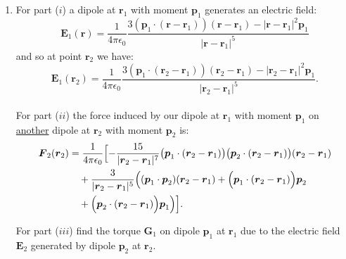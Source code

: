 \begin{enumerate}
    \newpage

    \item For part ($i$)
    a dipole at $\boldsymbol{r}_1$
    with moment $\boldsymbol{p}_1$
    generates an electric field:
    $$\boldsymbol{E}_1(\boldsymbol{r})=\frac{1}{4\pi\epsilon_0}
    \frac{3(\boldsymbol{p}_1\cdot(\boldsymbol{r}
    -\boldsymbol{r}_1))(\boldsymbol{r}-\boldsymbol{r}_1)
    -|\boldsymbol{r}-\boldsymbol{r}_1|^2\boldsymbol{p}_1}
    {|\boldsymbol{r}-\boldsymbol{r}_1|^5}$$
    and so at point $\boldsymbol{r}_2$ we have:
    $$\boldsymbol{E}_1(\boldsymbol{r}_2)=\frac{1}{4\pi\epsilon_0}
    \frac{3(\boldsymbol{p}_1\cdot(\boldsymbol{r}_2
    -\boldsymbol{r}_1))(\boldsymbol{r}_2-\boldsymbol{r}_1)
    -|\boldsymbol{r}_2-\boldsymbol{r}_1|^2\boldsymbol{p}_1}
    {|\boldsymbol{r}_2-\boldsymbol{r}_1|^5}.$$ \\

    For part ($ii$) the force induced by our dipole at $\boldsymbol{r}_1$
    with moment $\boldsymbol{p}_1$ on \underline{another} dipole 
    at $\boldsymbol{r}_2$ with moment $\boldsymbol{p}_2$ is:
    \begin{align*}
        \boldsymbol{F}_2(\boldsymbol{r}_2)
        &=\frac{1}{4\pi\epsilon_0}
        \Bigl[-\frac{15}{|\boldsymbol{r}_2-\boldsymbol{r}_1|^7}
        \bigl(\boldsymbol{p}_1\cdot(\boldsymbol{r}_2-\boldsymbol{r}_1)\bigr)
        \bigl(\boldsymbol{p}_2\cdot(\boldsymbol{r}_2-\boldsymbol{r}_1)\bigr)
        (\boldsymbol{r}_2-\boldsymbol{r}_1) \\
        &\quad+\frac{3}{|\boldsymbol{r}_2-\boldsymbol{r}_1|^5}
        \Bigl((\boldsymbol{p}_1\cdot\boldsymbol{p}_2)
        (\boldsymbol{r}_2-\boldsymbol{r}_1)
        +\Bigl(\boldsymbol{p}_1\cdot
        (\boldsymbol{r}_2-\boldsymbol{r}_1)\Bigr)
        \boldsymbol{p}_2 \\
        &\quad+\Bigl(\boldsymbol{p}_2\cdot
        (\boldsymbol{r}_2-\boldsymbol{r}_1)\Bigr)
        \boldsymbol{p}_1
        \Bigr)\Bigr]. \\
    \end{align*}

    For part ($iii$) find the torque $\boldsymbol{G}_1$
    on dipole $\boldsymbol{p}_1$ at $\boldsymbol{r}_1$
    due to the electric field $\boldsymbol{E}_2$ generated by
    dipole $\boldsymbol{p}_2$ at $\boldsymbol{r}_2$. \\


\end{enumerate}
